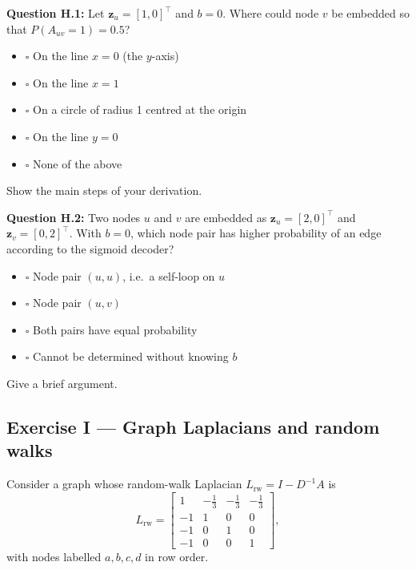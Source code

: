 \documentclass[12pt,a4paper]{article}
\begin{document}
\textbf{Question H.1:} Let $\mathbf{z}_u=[1,0]^\top$ and $b=0$.  Where could node $v$ be
embedded so that $P(A_{uv}=1)=0.5$?

\begin{itemize}[noitemsep,label={}]
  \item[\textbf{A}] $\square$ \quad On the line $x=0$ (the $y$-axis)
  \item[\textbf{B}] $\square$ \quad On the line $x=1$
  \item[\textbf{C}] $\square$ \quad On a circle of radius 1 centred at the origin
  \item[\textbf{D}] $\square$ \quad On the line $y=0$
  \item[\textbf{E}] $\square$ \quad None of the above
\end{itemize}

Show the main steps of your derivation.

\vspace{4cm}

\textbf{Question H.2:} Two nodes $u$ and $v$ are embedded as $\mathbf{z}_u=[2,0]^\top$ and
$\mathbf{z}_v=[0,2]^\top$.  With $b=0$, which node pair has higher probability of an edge
according to the sigmoid decoder?

\begin{itemize}[noitemsep,label={}]
  \item[\textbf{A}] $\square$ \quad Node pair $(u, u)$, i.e.\ a self-loop on $u$
  \item[\textbf{B}] $\square$ \quad Node pair $(u, v)$
  \item[\textbf{C}] $\square$ \quad Both pairs have equal probability
  \item[\textbf{D}] $\square$ \quad Cannot be determined without knowing $b$
\end{itemize}

Give a brief argument.

\vspace{3cm}

\newpage
\subsection*{Exercise I --- Graph Laplacians and random walks}

Consider a graph whose random-walk Laplacian $L_{\mathrm{rw}}=I-D^{-1}A$ is
\[
  L_{\mathrm{rw}} =
  \begin{bmatrix}
    1 & -\tfrac{1}{3} & -\tfrac{1}{3} & -\tfrac{1}{3} \\[4pt]
    -1 & 1 & 0 & 0 \\[4pt]
    -1 & 0 & 1 & 0 \\[4pt]
    -1 & 0 & 0 & 1
  \end{bmatrix},
\]
with nodes labelled $a, b, c, d$ in row order.
\end{document}
